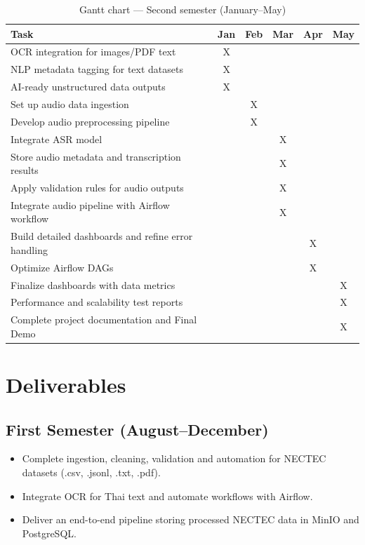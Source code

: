 \documentclass[12pt,oneside,openright,a4paper]{cpe-english-project}
\begin{document}
\begin{table}[H]
\centering
\caption{Gantt chart --- Second semester (January--May)}\label{tbl:gantt-sem2}
\small
\begin{tabular}{|p{}|c|c|c|c|c|}
\hline
\textbf{Task} & \textbf{Jan} & \textbf{Feb} & \textbf{Mar} & \textbf{Apr} & \textbf{May} \\ \hline
OCR integration for images/PDF text & X & & & & \\ \hline
NLP metadata tagging for text datasets & X & & & & \\ \hline
AI-ready unstructured data outputs & X & & & & \\ \hline
Set up audio data ingestion & & X & & & \\ \hline
Develop audio preprocessing pipeline & & X & & & \\ \hline
Integrate ASR model & & & X & & \\ \hline
Store audio metadata and transcription results & & & X & & \\ \hline
Apply validation rules for audio outputs & & & X & & \\ \hline
Integrate audio pipeline with Airflow workflow & & & X & & \\ \hline
Build detailed dashboards and refine error handling & & & & X & \\ \hline
Optimize Airflow DAGs & & & & X & \\ \hline
Finalize dashboards with data metrics & & & & & X \\ \hline
Performance and scalability test reports & & & & & X \\ \hline
Complete project documentation and Final Demo & & & & & X \\ \hline
\end{tabular}
\end{table}

\section{Deliverables}

\subsection{First Semester (August--December)}
\begin{itemize}
\item Complete ingestion, cleaning, validation and automation for NECTEC datasets (.csv, .jsonl, .txt, .pdf).
\item Integrate OCR for Thai text and automate workflows with Airflow.
\item Deliver an end-to-end pipeline storing processed NECTEC data in MinIO and PostgreSQL.
\end{itemize}
\end{document}
